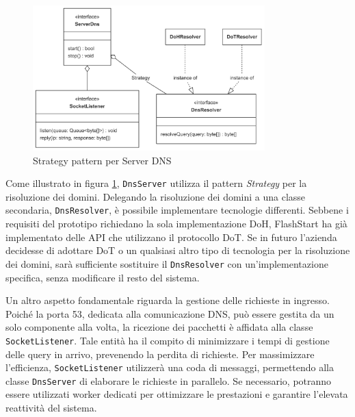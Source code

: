 \documentclass[12pt,a4paper,openright,twoside]{book}
\begin{document}
\begin{figure}[H]
	\centering
	\includegraphics[width=0.8\textwidth]{figures/dns-strategy-pattern.png}
	\caption{Strategy pattern per Server DNS}
	\label{fig:dns-strategy-pattern}
\end{figure}
Come illustrato in figura \ref{fig:dns-strategy-pattern}, \texttt{DnsServer} utilizza il pattern \textit{Strategy} per la risoluzione dei domini.
Delegando la risoluzione dei domini a una classe secondaria, \texttt{DnsResolver}, è possibile implementare tecnologie differenti.
Sebbene i requisiti del prototipo richiedano la sola implementazione \gls{DoH}, FlashStart ha già implementato delle API che utilizzano il protocollo \gls{DoT}.
Se in futuro l'azienda decidesse di adottare \gls{DoT} o un qualsiasi altro tipo di tecnologia per la risoluzione dei domini, sarà sufficiente sostituire il \texttt{DnsResolver} con un'implementazione specifica, senza modificare il resto del sistema.


Un altro aspetto fondamentale riguarda la gestione delle richieste in ingresso.  
Poiché la porta 53, dedicata alla comunicazione \gls{DNS}, può essere gestita da un solo componente alla volta, la ricezione dei pacchetti è affidata alla classe \texttt{SocketListener}. 
Tale entità ha il compito di minimizzare i tempi di gestione delle query in arrivo, prevenendo la perdita di richieste.
Per massimizzare l'efficienza, \texttt{SocketListener} utilizzerà una coda di messaggi, permettendo alla classe \texttt{DnsServer} di elaborare le richieste in parallelo.
Se necessario, potranno essere utilizzati worker dedicati per ottimizzare le prestazioni e garantire l'elevata reattività del sistema.
\end{document}
